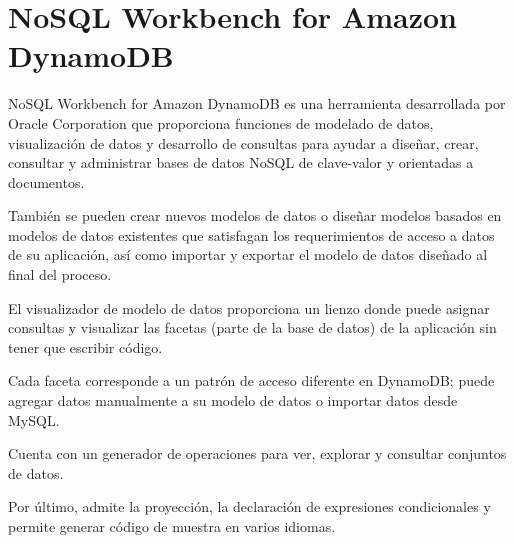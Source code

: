 \section{NoSQL Workbench for Amazon DynamoDB}

NoSQL Workbench for Amazon DynamoDB es una herramienta desarrollada por Oracle Corporation que proporciona funciones de modelado de datos, visualización de datos y desarrollo de consultas para ayudar a diseñar, crear, consultar y administrar bases de datos NoSQL de clave-valor y orientadas a documentos.


También se pueden crear nuevos modelos de datos o diseñar modelos basados ​​en modelos de datos existentes que satisfagan los requerimientos de acceso a datos de su aplicación, así como importar y exportar el modelo de datos diseñado al final del proceso. 


El visualizador de modelo de datos proporciona un lienzo donde puede asignar consultas y visualizar las facetas (parte de la base de datos) de la aplicación sin tener que escribir código.


Cada faceta corresponde a un patrón de acceso diferente en DynamoDB; puede agregar datos manualmente a su modelo de datos o importar datos desde MySQL. 


Cuenta con un generador de operaciones para ver, explorar y consultar conjuntos de datos.


Por último, admite la proyección, la declaración de expresiones condicionales y permite generar código de muestra en varios idiomas.


